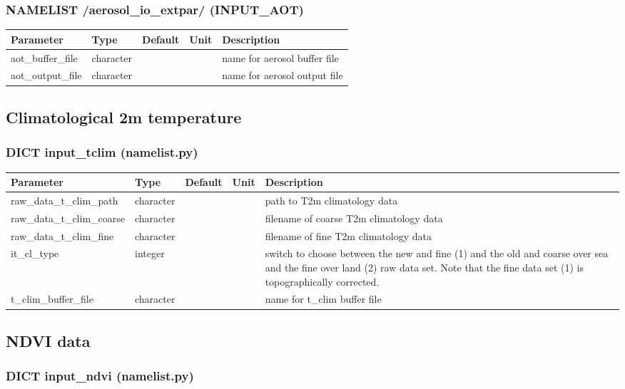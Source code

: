 \documentclass[a4paper,10pt,DIV14,BCOR1cm,titlepage,twoside]{scrartcl}
\providecommand{\tabularnewline}{\\}
\begin{document}
\subsubsection*{NAMELIST /aerosol\_io\_extpar/ (INPUT\_AOT)}
\begin{longtable}{|p{4cm}|p{1.5cm}|p{1.5cm}|p{1cm}|p{6cm}|}
\hline 
\textbf{Parameter}& \textbf{Type}& \textbf{Default}& \textbf{Unit}& \textbf{Descriptio}n
\tabularnewline
\hline
\endhead
\hline
aot\_buffer\_file & character & &  & name for aerosol buffer file
\tabularnewline
\hline 
aot\_output\_file & character & &  & name for aerosol output file \tabularnewline
\hline
\bottomrule
\end{longtable}

\subsection{Climatological 2m temperature}\label{namelist_input_for_extpar_cru}

\subsubsection*{DICT input\_tclim (namelist.py)}

\begin{longtable}{|p{4cm}|p{1.5cm}|p{1.5cm}|p{1cm}|p{6cm}|}
\hline 
\textbf{Parameter}& \textbf{Type}& \textbf{Default}& \textbf{Unit}& \textbf{Description}
\tabularnewline
\hline
\endhead
\hline 
raw\_data\_t\_clim\_path & character & &  & path to T2m climatology data \tabularnewline
\hline 
raw\_data\_t\_clim\_coarse & character & &  & filename of coarse T2m climatology  data \tabularnewline
\hline
raw\_data\_t\_clim\_fine & character & &  & filename of fine T2m climatology  data \tabularnewline
\hline
it\_cl\_type & integer & & & switch to choose between the new and fine (1) and the old and coarse over sea and the fine over land (2) raw data set. 
Note that the fine data set (1) is topographically corrected.\tabularnewline
\hline
t\_clim\_buffer\_file & character & &  & name for t\_clim buffer file
\tabularnewline
\hline

\bottomrule
\end{longtable}

\subsection{NDVI data}\label{namelist_input_for_extpar_ndvi}

\subsubsection*{DICT input\_ndvi (namelist.py)}
\end{document}
